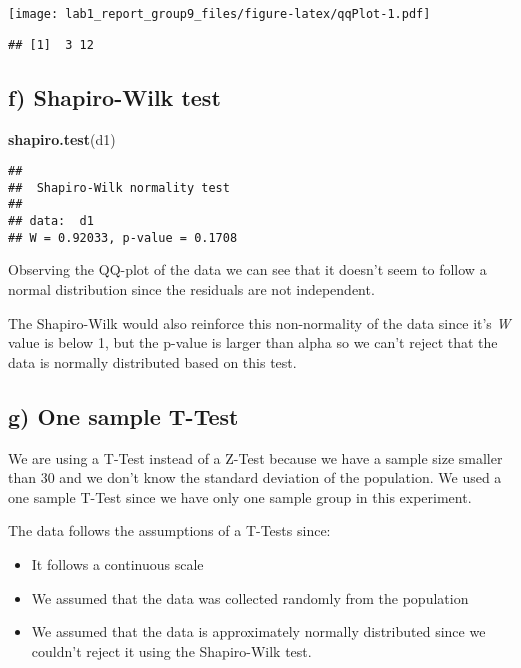 \documentclass[
]{article}
\newenvironment{Shaded}{\begin{snugshade}}{\end{snugshade}}
\newcommand{\KeywordTok}[1]{\textcolor[rgb]{0.13,0.29,0.53}{\textbf{#1}}}
\newcommand{\NormalTok}[1]{#1}
\providecommand{\tightlist}{%
  \setlength{\itemsep}{0pt}\setlength{\parskip}{0pt}}
\begin{document}
\texttt{[image: lab1\_report\_group9\_files/figure-latex/qqPlot-1.pdf]}

\begin{verbatim}
## [1]  3 12
\end{verbatim}

\hypertarget{f-shapiro-wilk-test}{%
\subsection{f) Shapiro-Wilk test}\label{f-shapiro-wilk-test}}

\begin{Shaded}
\begin{Highlighting}[]
\KeywordTok{shapiro.test}\NormalTok{(d1)}
\end{Highlighting}
\end{Shaded}

\begin{verbatim}
## 
##  Shapiro-Wilk normality test
## 
## data:  d1
## W = 0.92033, p-value = 0.1708
\end{verbatim}

Observing the QQ-plot of the data we can see that it doesn't seem to
follow a normal distribution since the residuals are not independent.

The Shapiro-Wilk would also reinforce this non-normality of the data
since it's \emph{W} value is below 1, but the p-value is larger than
alpha so we can't reject that the data is normally distributed based on
this test.

\hypertarget{g-one-sample-t-test}{%
\subsection{g) One sample T-Test}\label{g-one-sample-t-test}}

We are using a T-Test instead of a Z-Test because we have a sample size
smaller than 30 and we don't know the standard deviation of the
population. We used a one sample T-Test since we have only one sample
group in this experiment.

The data follows the assumptions of a T-Tests since:

\begin{itemize}
\tightlist
\item
  It follows a continuous scale
\item
  We assumed that the data was collected randomly from the population
\item
  We assumed that the data is approximately normally distributed since
  we couldn't reject it using the Shapiro-Wilk test.
\end{itemize}
\end{document}
